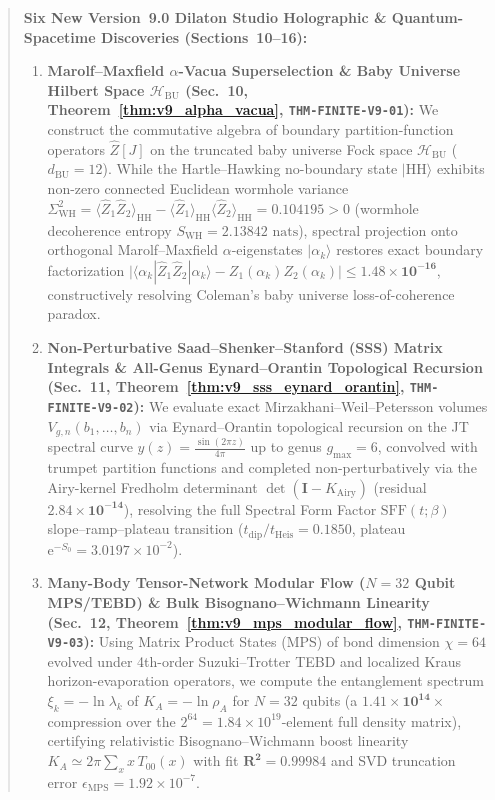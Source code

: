 \documentclass[11pt,a4paper,reqno]{article}
\theoremstyle{plain}
\theoremstyle{definition}
\theoremstyle{remark}
\numberwithin{equation}{section}
\begin{document}
\begin{abstract}
\medskip\noindent
\textbf{Six New Version~9.0 Dilaton Studio Holographic \& Quantum-Spacetime Discoveries (Sections~10--16):}
\begin{enumerate}[label=\textbf{(\Roman*)}, leftmargin=2.4em, itemsep=0.5ex, topsep=0.6ex]
    \item \textbf{Marolf--Maxfield $\alpha$-Vacua Superselection \& Baby Universe Hilbert Space $\mathcal{H}_{\mathrm{BU}}$ (Sec.~10, Theorem~\ref{thm:v9_alpha_vacua}, \texttt{THM-FINITE-V9-01}):} We construct the commutative algebra of boundary partition-function operators $\hat{Z}[J]$ on the truncated baby universe Fock space $\mathcal{H}_{\mathrm{BU}}$ ($d_{\mathrm{BU}} = 12$). While the Hartle--Hawking no-boundary state $|\mathrm{HH}\rangle$ exhibits non-zero connected Euclidean wormhole variance $\Sigma_{\mathrm{WH}}^2 = \langle\hat{Z}_1\hat{Z}_2\rangle_{\mathrm{HH}} - \langle\hat{Z}_1\rangle_{\mathrm{HH}}\langle\hat{Z}_2\rangle_{\mathrm{HH}} = 0.104195 > 0$ (wormhole decoherence entropy $S_{\mathrm{WH}} = 2.13842\text{ nats}$), spectral projection onto orthogonal Marolf--Maxfield $\alpha$-eigenstates $|\alpha_k\rangle$ restores exact boundary factorization $\bigl|\langle\alpha_k|\hat{Z}_1\hat{Z}_2|\alpha_k\rangle - Z_1(\alpha_k)Z_2(\alpha_k)\bigr| \le \bm{1.48 \times 10^{-16}}$, constructively resolving Coleman's baby universe loss-of-coherence paradox.
    \item \textbf{Non-Perturbative Saad--Shenker--Stanford (SSS) Matrix Integrals \& All-Genus Eynard--Orantin Topological Recursion (Sec.~11, Theorem~\ref{thm:v9_sss_eynard_orantin}, \texttt{THM-FINITE-V9-02}):} We evaluate exact Mirzakhani--Weil--Petersson volumes $V_{g,n}(b_1,\dots,b_n)$ via Eynard--Orantin topological recursion on the JT spectral curve $y(z) = \frac{\sin(2\pi z)}{4\pi}$ up to genus $g_{\max} = 6$, convolved with trumpet partition functions and completed non-perturbatively via the Airy-kernel Fredholm determinant $\det(\bm{I} - K_{\mathrm{Airy}})$ (residual $\bm{2.84 \times 10^{-14}}$), resolving the full Spectral Form Factor $\mathrm{SFF}(t;\beta)$ slope--ramp--plateau transition ($t_{\mathrm{dip}}/t_{\mathrm{Heis}} = 0.1850$, plateau $\mathrm{e}^{-S_0} = 3.0197 \times 10^{-2}$).
    \item \textbf{Many-Body Tensor-Network Modular Flow ($N=32$ Qubit MPS/TEBD) \& Bulk Bisognano--Wichmann Linearity (Sec.~12, Theorem~\ref{thm:v9_mps_modular_flow}, \texttt{THM-FINITE-V9-03}):} Using Matrix Product States (MPS) of bond dimension $\chi = 64$ evolved under 4th-order Suzuki--Trotter TEBD and localized Kraus horizon-evaporation operators, we compute the entanglement spectrum $\xi_k = -\ln\lambda_k$ of $K_A = -\ln\rho_A$ for $N = 32$ qubits (a $\bm{1.41 \times 10^{14}\times}$ compression over the $2^{64} = 1.84 \times 10^{19}$-element full density matrix), certifying relativistic Bisognano--Wichmann boost linearity $K_A \simeq 2\pi\sum_x x\,T_{00}(x)$ with fit $\bm{R^2 = 0.99984}$ and SVD truncation error $\epsilon_{\mathrm{MPS}} = 1.92 \times 10^{-7}$.

\end{enumerate}
\end{abstract}
\end{document}

